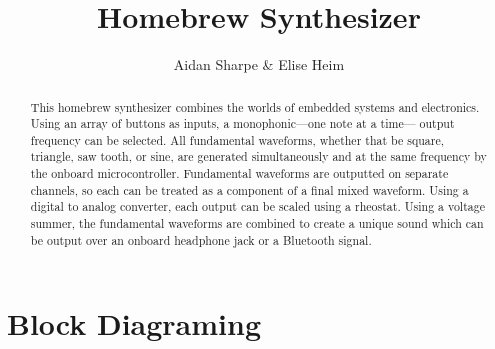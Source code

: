 \documentclass{IEEEtran}
\title{Homebrew Synthesizer}
\author{Aidan Sharpe \& Elise Heim}
\begin{document}
\maketitle

\begin{abstract}
    This homebrew synthesizer combines the worlds of embedded systems and electronics. Using an array of buttons as inputs, a monophonic---one note at a time--- output frequency can be selected. All fundamental waveforms, whether that be square, triangle, saw tooth, or sine, are generated simultaneously and at the same frequency by the onboard microcontroller. Fundamental waveforms are outputted on separate channels, so each can be treated as a component of a final mixed waveform. Using a digital to analog converter, each output can be scaled using a rheostat. Using a voltage summer, the fundamental waveforms are combined to create a unique sound which can be output over an onboard headphone jack or a Bluetooth signal.
\end{abstract}

\section{Block Diagraming}
\end{document}

